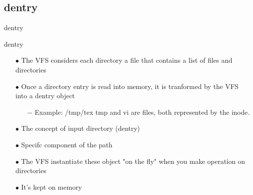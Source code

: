 \documentclass{beamer}
\begin{document}
\subsection{dentry}

\begin{frame}{dentry}
	
	
\end{frame}

\begin{frame}{dentry}
	
	\begin{itemize}[<+->]

		\item[$\bullet$]{The VFS considers each directory a file that contains a list of files and directories}
		\item[$\bullet$]{Once a directory entry is read into memory, it is tranformed by the VFS into a dentry object}
			\begin{itemize}
				\item[$-$]{Example: /tmp/tex \newline tmp and vi are files, both represented by the inode.}
			\end{itemize}
		\item[$\bullet$]{The concept of input directory (dentry)}
		\item[$\bullet$]{Specifc component of the path}
		\item[$\bullet$]{The VFS instantiate these object "on the fly" when you make operation on directories}
		\item[$\bullet$]{It's kept on memory}
	\end{itemize}

\end{frame}
\end{document}
